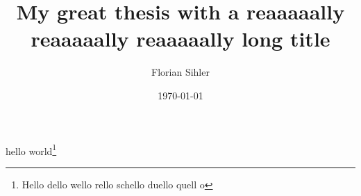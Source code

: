 \documentclass[
	verbose,
	english,
	paper=a4,  %
]{thesis}
\title{My great thesis with a reaaaaally reaaaaally reaaaaally long title}
\author{Florian Sihler}
\date{\today}
\begin{document}
	\maketitle

	\makedeclarationofauthenticity %

	hello world\footnote{\the\marginparwidth Hello dello wello rello schello duello quell o} %
	\blindtext

	\tableofcontents

	\Blinddocument
\end{document}
